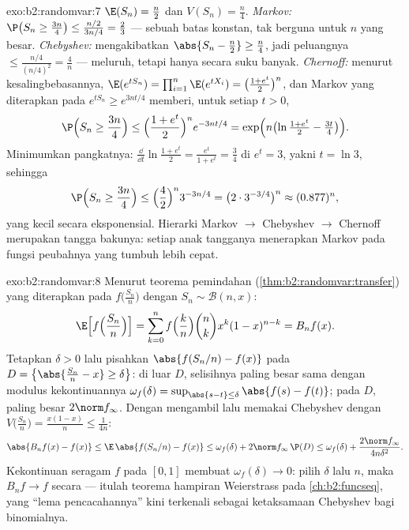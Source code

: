 \begin{solution}{exo:b2:randomvar:7}
$\E(S_n) = \frac n2$ dan $V(S_n) = \frac n4$.
\emph{Markov:} $\P\bigl(S_n \geq \frac{3n}4\bigr) \leq
\frac{n/2}{3n/4} = \frac23$ --- sebuah batas konstan, tak berguna untuk
$n$ yang besar.
\emph{Chebyshev:}  mengakibatkan $\abs{S_n - \frac n2} \geq
\frac n4$, jadi peluangnya $\leq \frac{n/4}{(n/4)^2} =
\frac4n$ --- meluruh, tetapi hanya secara suku banyak.
\emph{Chernoff:} menurut kesalingbebasannya, $\E(e^{tS_n}) =
\prod_{i=1}^n\E(e^{tX_i}) = \bigl(\frac{1 + e^t}{2}\bigr)^n$, dan
Markov yang diterapkan pada $e^{tS_n} \geq e^{3nt/4}$ memberi, untuk setiap $t >
0$,
\[
\P\Bigl(S_n \geq \frac{3n}4\Bigr)
\leq \Bigl(\frac{1 + e^t}{2}\Bigr)^n e^{-3nt/4}
= \exp\Bigl(n\bigl(\ln\tfrac{1 + e^t}{2} - \tfrac{3t}4\bigr)\Bigr).
\]
Minimumkan pangkatnya: $\frac{\dd}{\dd t}\ln\frac{1+e^t}{2} =
\frac{e^t}{1 + e^t} = \frac34$ di $e^t = 3$, yakni $t = \ln 3$,
sehingga
\[
\P\Bigl(S_n \geq \frac{3n}4\Bigr)
\leq \Bigl(\frac{4}{2}\Bigr)^n 3^{-3n/4}
= \bigl(2 \cdot 3^{-3/4}\bigr)^n \approx (0.877)^n ,
\]
yang kecil secara eksponensial. Hierarki Markov $\to$ Chebyshev $\to$
Chernoff merupakan tangga bakunya: setiap anak tangganya menerapkan Markov pada
fungsi peubahnya yang tumbuh lebih cepat.
\end{solution}

\begin{solution}{exo:b2:randomvar:8}
Menurut teorema pemindahan (\cref{thm:b2:randomvar:transfer})
yang diterapkan pada $f\bigl(\frac{S_n}{n}\bigr)$ dengan $S_n \sim
\mathcal{B}(n, x)$:
\[
\E\Bigl[f\Bigl(\frac{S_n}{n}\Bigr)\Bigr]
= \sum_{k=0}^n f\Bigl(\frac kn\Bigr)\binom nk x^k(1-x)^{n-k}
= B_nf(x) .
\]
Tetapkan $\delta > 0$ lalu pisahkan $\abs{f(S_n/n) - f(x)}$ pada  $D
= \bigl\{\abs{\frac{S_n}{n} - x} \geq \delta\bigr\}$:
di luar $D$, selisihnya paling besar sama dengan modulus kekontinuannya
$\omega_f(\delta) = \sup_{\abs{s - t}\leq\delta}\abs{f(s) -
f(t)}$; pada $D$, paling besar $2\norm f_\infty$. Dengan mengambil  lalu
memakai Chebyshev dengan $V\bigl(\frac{S_n}{n}\bigr) =
\frac{x(1-x)}{n} \leq \frac{1}{4n}$:
\[
\abs{B_nf(x) - f(x)}
\leq \E\,\abs{f(S_n/n) - f(x)}
\leq \omega_f(\delta)
+ 2\norm f_\infty\,\P(D)
\leq \omega_f(\delta) + \frac{2\norm f_\infty}{4n\delta^2} .
\]
Kekontinuan seragam $f$ pada $[0, 1]$ membuat $\omega_f(\delta) \to
0$: pilih $\delta$ lalu $n$, maka $B_nf \to f$ secara  --- itulah
teorema hampiran Weierstrass pada \cref{ch:b2:funcseq}, yang
``lema pencacahannya'' kini terkenali sebagai ketaksamaan Chebyshev
bagi  binomialnya.
\end{solution}


